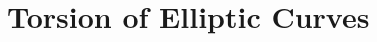 \documentclass[../notes.tex]{subfiles}
\begin{document}
\section{Torsion of Elliptic Curves}
\end{document}

